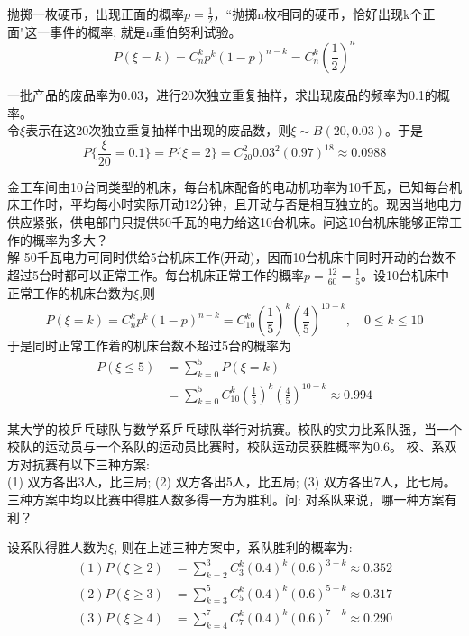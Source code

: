 \begin{frame}
\begin{example}
   抛掷一枚硬币，出现正面的概率$p=\frac{1}{2}$，``抛掷n枚相同的硬币，恰好出现k个正面"这一事件的概率, 就是n重伯努利试验。\\
   \[P(\xi=k)=C_n^kp^k(1-p)^{n-k}=C_n^k(\frac{1}{2})^n\]
\end{example}
\begin{example}
一批产品的废品率为0.03，进行20次独立重复抽样，求出现废品的频率为0.1的概率。\\
令$\xi$表示在这20次独立重复抽样中出现的废品数，则$\xi\sim B(20,0.03)$。于是
\[P\{\frac{\xi}{20}=0.1\}=P\{\xi=2\}=C_{20}^{2}0.03^{2}(0.97)^{18}\approx 0.0988\]
\end{example}
\end{frame}

\begin{frame}
金工车间由10台同类型的机床，每台机床配备的电动机功率为10千瓦，已知每台机床工作时，平均每小时实际开动12分钟，且开动与否是相互独立的。现因当地电力供应紧张，供电部门只提供50千瓦的电力给这10台机床。问这10台机床能够正常工作的概率为多大？\\
解 50千瓦电力可同时供给5台机床工作(开动)，因而10台机床中同时开动的台数不超过5台时都可以正常工作。每台机床正常工作的概率$p=\frac{12}{60}=\frac{1}{5}$。设10台机床中正常工作的机床台数为$\xi$,则
\[P(\xi=k)=C_n^kp^k(1-p)^{n-k}=C_{10}^k(\frac{1}{5})^k(\frac{4}{5})^{10-k},\quad 0\le k\le 10 \]
于是同时正常工作着的机床台数不超过5台的概率为
\begin{align*}
P(\xi\le 5) &= \sum_{k=0}^{5}P(\xi=k)\\
&=\sum_{k=0}^{5}C_{10}^k(\frac{1}{5})^k(\frac{4}{5})^{10-k}\approx 0.994
\end{align*}
\end{frame}

\begin{frame}
某大学的校乒乓球队与数学系乒乓球队举行对抗赛。校队的实力比系队强，当一个校队的运动员与一个系队的运动员比赛时，校队运动员获胜概率为0.6。 校、系双方对抗赛有以下三种方案:\\
(1) 双方各出3人，比三局; (2) 双方各出5人，比五局; (3) 双方各出7人，比七局。\\
三种方案中均以比赛中得胜人数多得一方为胜利。问: 对系队来说，哪一种方案有利？
\begin{block}{}
	设系队得胜人数为$\xi$, 则在上述三种方案中，系队胜利的概率为:
	\begin{align*}
	(1) P(\xi\ge 2) &=\sum_{k=2}^{3}C_3^k(0.4)^k(0.6)^{3-k}\approx 0.352\\
    (2) P(\xi\ge 3) &=\sum_{k=3}^{5}C_5^k(0.4)^k(0.6)^{5-k}\approx 0.317\\
    (3) P(\xi\ge 4) &=\sum_{k=4}^{7}C_7^k(0.4)^k(0.6)^{7-k}\approx 0.290\\
	\end{align*}
\end{block}
\end{frame}


